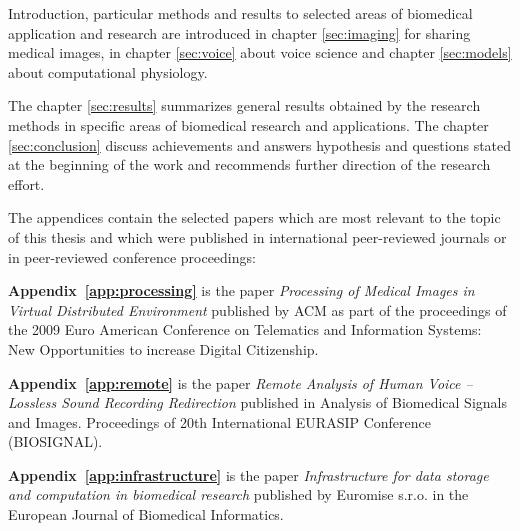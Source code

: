 
Introduction, particular methods and results to selected areas of biomedical application and research are introduced in chapter \ref{sec:imaging} for sharing medical images, in chapter \ref{sec:voice} about voice science and chapter \ref{sec:models} about computational physiology.

The chapter \ref{sec:results} summarizes general results obtained by the research methods in specific areas of biomedical research and applications. The chapter \ref{sec:conclusion} discuss achievements and answers hypothesis and questions stated at the beginning of the work and recommends further direction of the research effort.

The appendices contain the selected papers \cite{kulhanek2009,kulhanek2010b,kulhanek2010c,Kulhanek2014Parameters, Kulhanek2014Modeling, Kulhanek2014mefanet, Matejak2014sj} which are most relevant to the topic of this thesis and which were published in international peer-reviewed journals or in peer-reviewed conference proceedings:

\textbf{Appendix~\ref{app:processing}} is the paper \cite{kulhanek2009} \emph{Processing of Medical Images in Virtual Distributed Environment} published by ACM as part of the proceedings of the 2009 Euro American Conference on Telematics and Information Systems: New Opportunities to increase Digital Citizenship.

\textbf{Appendix~\ref{app:remote}} is the paper \cite{kulhanek2010b} \emph{Remote Analysis of Human Voice – Lossless Sound Recording Redirection} published in Analysis of Biomedical Signals and Images. Proceedings of 20th International EURASIP Conference (BIOSIGNAL).


\textbf{Appendix~\ref{app:infrastructure}} is the paper \cite{kulhanek2010c} \emph{Infrastructure for data storage and computation in biomedical research} published by Euromise s.r.o. in the European Journal of Biomedical Informatics.

